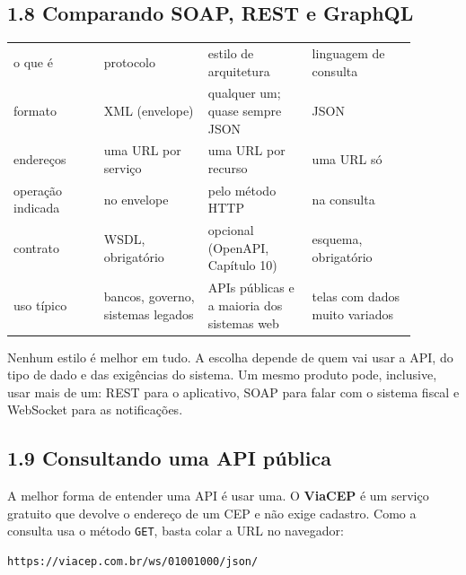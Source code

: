 \subsection{1.8 Comparando SOAP, REST e GraphQL}

\begin{center}
\begin{tabular}{@{}P{0.2\linewidth}P{0.23\linewidth}P{0.23\linewidth}P{0.23\linewidth}@{}}
\toprule
{}
\tblheader{} &  &  &  \\
\midrule
o que é & protocolo & estilo de arquitetura & linguagem de consulta \\
 formato & XML (envelope) & qualquer um; quase sempre JSON & JSON \\
endereços & uma URL por serviço & uma URL por recurso & uma URL só \\
 operação indicada & no envelope & pelo método HTTP & na consulta \\
contrato & WSDL, obrigatório & opcional (OpenAPI, Capítulo 10) & esquema, obrigatório \\
 uso típico & bancos, governo, sistemas legados & APIs públicas e a maioria dos sistemas web & telas com dados muito variados \\
\bottomrule
\end{tabular}
\end{center}

Nenhum estilo é melhor em tudo. A escolha depende de quem vai usar a API, do tipo de dado e das exigências do sistema. Um mesmo produto pode, inclusive, usar mais de um: REST para o aplicativo, SOAP para falar com o sistema fiscal e WebSocket para as notificações.

\subsection{1.9 Consultando uma API pública}

A melhor forma de entender uma API é usar uma. O \textbf{ViaCEP} é um serviço gratuito que devolve o endereço de um CEP e não exige cadastro. Como a consulta usa o método \texttt{GET}, basta colar a URL no navegador:

\begin{codigo}
\begin{Verbatim}[breaklines=true, breaksymbolleft={}, fontsize=\footnotesize]
https://viacep.com.br/ws/01001000/json/
\end{Verbatim}
\end{codigo}

